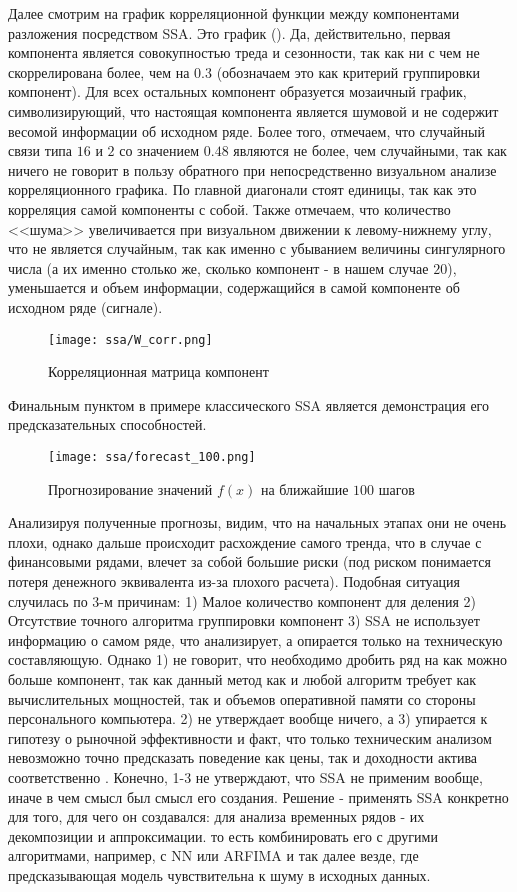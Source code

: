 Далее смотрим на график корреляционной функции между компонентами разложения посредством SSA. Это график (). Да, действительно, первая компонента является совокупностью треда и сезонности, так как ни с чем не скоррелирована более, чем на $0.3$ (обозначаем это как критерий группировки компонент). Для всех остальных компонент образуется мозаичный график, символизирующий, что настоящая компонента является шумовой и не содержит весомой информации об исходном ряде. Более того, отмечаем, что случайный связи типа $16$ и $2$ со значением $0.48$ являются не более, чем случайными, так как ничего не говорит в пользу обратного при непосредственно визуальном анализе корреляционного графика. По главной диагонали стоят единицы, так как это корреляция самой компоненты с собой. Также отмечаем, что количество <<шума>> увеличивается при визуальном движении к левому-нижнему углу, что не является случайным, так как именно с убыванием величины сингулярного числа (а их именно столько же, сколько компонент - в нашем случае $20$), уменьшается и объем информации, содержащийся в самой компоненте об исходном ряде (сигнале).
\begin{figure}[H]
	\centering
	\texttt{[image: ssa/W\_corr.png]}
	\caption{Корреляционная матрица компонент} \label{fig::W_corr_ssa}
\end{figure}

\noindent Финальным пунктом в примере классического SSA является демонстрация его предсказательных способностей.
\begin{figure}[H]
	\centering
	\texttt{[image: ssa/forecast\_100.png]}
	\caption{Прогнозирование значений $f(x)$ на ближайшие $100$ шагов}
\end{figure}
\noindent Анализируя полученные прогнозы, видим, что на начальных этапах они не очень плохи, однако дальше происходит расхождение самого тренда, что в случае с финансовыми рядами, влечет за собой большие риски (под риском понимается потеря денежного эквивалента из-за плохого расчета). Подобная ситуация случилась по 3-м причинам: 1) Малое количество компонент для деления 2) Отсутствие точного алгоритма группировки компонент 3) SSA не использует информацию о самом ряде, что анализирует, а опирается только на техническую составляющую. Однако 1) не говорит, что необходимо дробить ряд на как можно больше компонент, так как данный метод как и любой алгоритм требует как вычислительных мощностей, так и объемов оперативной памяти со стороны персонального компьютера. 2) не утверждает вообще ничего, а 3) упирается к гипотезу о рыночной эффективности и факт, что только техническим анализом невозможно точно предсказать поведение как цены, так и доходности актива соответственно \cite{fama_market_efficiency}. Конечно, 1-3 не утверждают, что SSA не применим вообще, иначе в чем смысл был смысл его создания. Решение - применять SSA конкретно для того, для чего он создавался: для анализа временных рядов - их декомпозиции и аппроксимации. то есть комбинировать его с другими алгоритмами, например, с NN или ARFIMA и так далее везде, где предсказывающая модель чувствительна к шуму в исходных данных. 